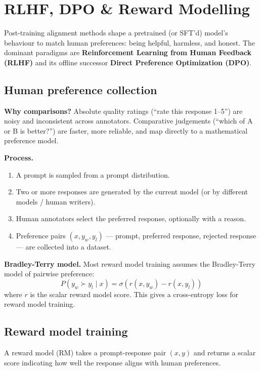 
\section{RLHF, DPO \& Reward Modelling}

Post-training alignment methods shape a pretrained (or SFT'd) model's behaviour to
match human preferences: being helpful, harmless, and honest. The dominant paradigms
are \textbf{Reinforcement Learning from Human Feedback (RLHF)} and its offline
successor \textbf{Direct Preference Optimization (DPO)}.

\subsection{Human preference collection}

\textbf{Why comparisons?} Absolute quality ratings (``rate this response 1--5'') are
noisy and inconsistent across annotators. Comparative judgements (``which of A or B is
better?'') are faster, more reliable, and map directly to a mathematical preference model.

\textbf{Process.}
\begin{enumerate}
  \item A prompt is sampled from a prompt distribution.
  \item Two or more responses are generated by the current model (or by different
    models / human writers).
  \item Human annotators select the preferred response, optionally with a reason.
  \item Preference pairs $(x, y_w, y_l)$ --- prompt, preferred response, rejected
    response --- are collected into a dataset.
\end{enumerate}

\textbf{Bradley-Terry model.} Most reward model training assumes the
Bradley-Terry model of pairwise preference:
\[
  P(y_w \succ y_l \mid x) = \sigma(r(x, y_w) - r(x, y_l))
\]
where $r$ is the scalar reward model score. This gives a cross-entropy loss for
reward model training.

\subsection{Reward model training}

A reward model (RM) takes a prompt-response pair $(x, y)$ and returns a scalar score
indicating how well the response aligns with human preferences.

